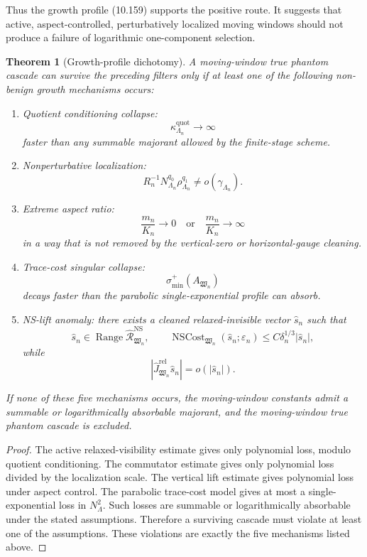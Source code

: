 \documentclass[11pt]{article}
\numberwithin{equation}{section}
\newtheorem{theorem}{Theorem}[section]
\DeclareMathOperator{\Range}{Range}
\begin{document}
Thus the growth profile (10.159) supports the positive route. It suggests that active, aspect-controlled, perturbatively localized moving windows should not produce a failure of logarithmic one-component selection.

\begin{theorem}[Growth-profile dichotomy]
A moving-window true phantom cascade can survive the preceding filters only if at least one of the following non-benign growth mechanisms occurs:

\begin{enumerate}
\item \emph{Quotient conditioning collapse:}
\[
\kappa_{\Lambda_n}^{\mathrm{quot}}\to\infty
\]
faster than any summable majorant allowed by the finite-stage scheme.

\item \emph{Nonperturbative localization:}
\[
R_n^{-1}N_{\Lambda_n}^{q_0}\rho_{\Lambda_n}^{q_1}
\not=o(\gamma_{\Lambda_n}).
\]

\item \emph{Extreme aspect ratio:}
\[
\frac{m_n}{K_n}\to0
\quad\text{or}\quad
\frac{m_n}{K_n}\to\infty
\]
in a way that is not removed by the vertical-zero or horizontal-gauge cleaning.

\item \emph{Trace-cost singular collapse:}
\[
\sigma_{\min}^+(A_{\mathfrak W_n})
\]
decays faster than the parabolic single-exponential profile can absorb.

\item \emph{NS-lift anomaly:}
there exists a cleaned relaxed-invisible vector \(\widehat s_n\) such that
\[
\widehat s_n\in
\Range
\widehat{\mathcal R}_{\mathfrak W_n}^{\mathrm{NS}},
\qquad
\operatorname{NSCost}_{\mathfrak W_n}(\widehat s_n;\varepsilon_n)
\le
C\delta_n^{1/3}|\widehat s_n|,
\]
while
\[
|\widehat J_{\mathfrak W_n}^{\mathrm{rel}}\widehat s_n|
=o(|\widehat s_n|).
\]
\end{enumerate}

If none of these five mechanisms occurs, the moving-window constants admit a summable or logarithmically absorbable majorant, and the moving-window true phantom cascade is excluded.
\end{theorem}

\begin{proof}
The active relaxed-visibility estimate gives only polynomial loss, modulo quotient conditioning. The commutator estimate gives only polynomial loss divided by the localization scale. The vertical lift estimate gives polynomial loss under aspect control. The parabolic trace-cost model gives at most a single-exponential loss in \(N_\Lambda^2\). Such losses are summable or logarithmically absorbable under the stated assumptions. Therefore a surviving cascade must violate at least one of the assumptions. These violations are exactly the five mechanisms listed above.
\end{proof}
\end{document}

